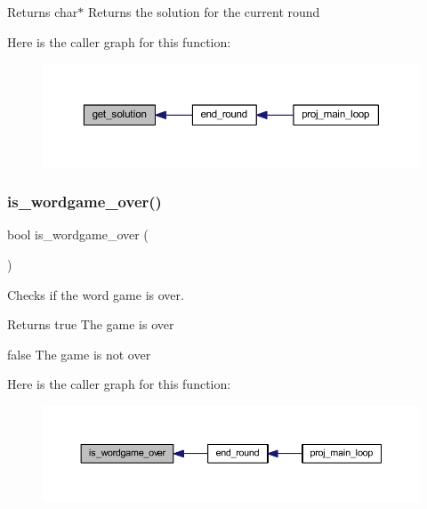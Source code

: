 \begin{DoxyReturn}{Returns}
char$\ast$ Returns the solution for the current round 
\end{DoxyReturn}
Here is the caller graph for this function\+:\nopagebreak
\begin{figure}[H]
\begin{center}
\leavevmode
\includegraphics[width=350pt]{group__wordpicker_gac8454d96157b95fc004c5188c7879cb7_icgraph}
\end{center}
\end{figure}
\mbox{\label{group__wordpicker_gad71f6bf17413141406dc7bb39628ae61}} 
\subsubsection{\texorpdfstring{is\+\_\+wordgame\+\_\+over()}{is\_wordgame\_over()}}
{\footnotesize\ttfamily bool is\+\_\+wordgame\+\_\+over (\begin{DoxyParamCaption}{ }\end{DoxyParamCaption})}



Checks if the word game is over. 

\begin{DoxyReturn}{Returns}
true The game is over 

false The game is not over 
\end{DoxyReturn}
Here is the caller graph for this function\+:\nopagebreak
\begin{figure}[H]
\begin{center}
\leavevmode
\includegraphics[width=350pt]{group__wordpicker_gad71f6bf17413141406dc7bb39628ae61_icgraph}
\end{center}
\end{figure}
\mbox{\label{group__wordpicker_ga7ae040ad09e5ee83b7d121c4290d79b6}} 
